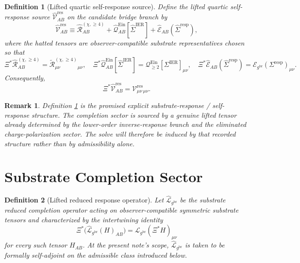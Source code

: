 \documentclass[11pt]{article}
\newcommand{\ObserverMap}{\Xi}
\newcommand{\ObserverMetric}{g^{\mathrm{br}}}
\newcommand{\BaseShift}{\Sigma^{\mathrm{IER}}}
\newcommand{\ResponseShift}{\Sigma^{\mathrm{resp}}}
\newcommand{\BaseLift}{\widehat\Sigma^{\mathrm{IER}}}
\newcommand{\ResponseLift}{\widehat\Sigma^{\mathrm{resp}}}
\newcommand{\ReLongFour}{\widetilde{\mathcal R}_{\mu\nu}^{(\chi,\ge 4)}}
\newcommand{\ResidualCore}{\mathcal V_{\mu\nu}^{\mathrm{res}}}
\newcommand{\ResidualLift}{\widehat{\mathcal V}^{\mathrm{res}}}
\newcommand{\SubReducedEin}{\widehat{\mathcal L}_{\ObserverMetric}}
\newcommand{\ReducedEin}{\mathcal L_{\ObserverMetric}}
\newcommand{\EinLin}{\mathcal E_{\ObserverMetric}}
\newcommand{\EinQuad}{\mathcal Q_{\ge 2}^{\mathrm{Ein}}}
\newtheorem{definition}{Definition}
\newtheorem{remark}{Remark}
\begin{document}
\begin{definition}[Lifted quartic self-response source]
\label{def:source}
Define the \emph{lifted quartic self-response source} \(\ResidualLift_{AB}\) on the candidate bridge branch by
\begin{equation}
\ResidualLift_{AB}
\equiv
\widehat{\mathcal R}_{AB}^{(\chi,\ge 4)}
+\widehat{\mathcal Q}_{AB}^{\mathrm{Ein}}[\BaseLift]
+\widehat{\mathcal E}_{AB}(\ResponseLift),
\label{eq:liftedsource}
\end{equation}
where the hatted tensors are observer-compatible substrate representatives chosen so that
\begin{equation}
\ObserverMap^*\widehat{\mathcal R}_{AB}^{(\chi,\ge 4)}=\ReLongFour{}_{\mu\nu},
\quad
\ObserverMap^*\widehat{\mathcal Q}_{AB}^{\mathrm{Ein}}[\BaseLift]=\EinQuad[\BaseShift]_{\mu\nu},
\quad
\ObserverMap^*\widehat{\mathcal E}_{AB}(\ResponseLift)=\EinLin(\ResponseShift)_{\mu\nu}.
\label{eq:pullbacks}
\end{equation}
Consequently,
\begin{equation}
\ObserverMap^*\ResidualLift_{AB}=\ResidualCore{}_{\mu\nu}.
\label{eq:sourcepull}
\end{equation}
\end{definition}

\begin{remark}
Definition \ref{def:source} is the promised explicit substrate-response / self-response structure. The completion sector is sourced by a genuine lifted tensor already determined by the lower-order inverse-response branch and the eliminated charge-polarization sector. The solve will therefore be induced by that recorded structure rather than by admissibility alone.
\end{remark}

\section{Substrate Completion Sector}

\begin{definition}[Lifted reduced response operator]
\label{def:operator}
Let \(\SubReducedEin\) be the substrate reduced completion operator acting on observer-compatible symmetric substrate tensors and characterized by the intertwining identity
\begin{equation}
\ObserverMap^*\bigl(\SubReducedEin(H)_{AB}\bigr)
=
\ReducedEin(\ObserverMap^*H)_{\mu\nu}
\label{eq:intertwine}
\end{equation}
for every such tensor \(H_{AB}\). At the present note's scope, \(\SubReducedEin\) is taken to be formally self-adjoint on the admissible class introduced below.
\end{definition}
\end{document}
